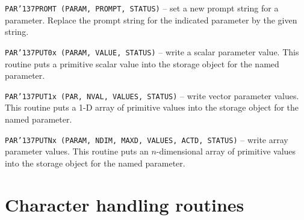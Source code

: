 \documentclass[twoside,11pt]{article}
\renewcommand{\_}{{\tt\char'137}}
\newcommand{\xlabel}[1]{}
\begin{document}
\begin{description}
\item{\tt PAR\_PROMT (PARAM, PROMPT, STATUS)}
-- set a new prompt string for a parameter.
Replace the prompt string for the indicated parameter by the
given string.


\item{\tt PAR\_PUT0x (PARAM, VALUE, STATUS)}
-- write a scalar parameter value.
This routine puts a primitive scalar value into the storage object
for the named parameter.



\item{\tt PAR\_PUT1x (PAR, NVAL, VALUES, STATUS)}
-- write vector parameter values.
This routine puts a 1-D array of primitive values into the storage
object for the named parameter.


\item{\tt PAR\_PUTNx (PARAM, NDIM, MAXD, VALUES, ACTD, STATUS)}
-- write array parameter values.
This routine puts an $n$-dimensional array of primitive values into 
the storage object
for the named parameter.

\end{description}

\newpage
\section{Character handling routines\label{apxchar}\xlabel{character_handling_routines}}
\end{document}
